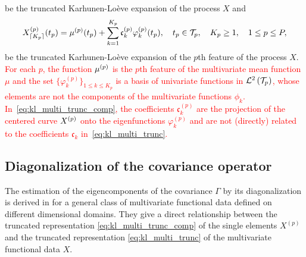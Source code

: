 be the truncated Karhunen-Loève expansion of the process $X$ and
\begin{equation}\label{eq:kl_multi_trunc_comp}
    X_{\lceil K_p \rceil}^{(p)}(t_p) = \mu^{(p)}(t_p) + \sum_{k = 1}^{K_p} \mathfrak{c}^{(p)}_k \varphi_k^{(p)}(t_p), \quad t_p \in \mathcal{T}_{p}, \quad K_p \geq 1, \quad 1 \leq p \leq P,
\end{equation}
be the truncated Karhunen-Loève expansion of the $p$th feature of the process $X$. \textcolor{red}{For each $p$, the function $\mu^{(p)}$ is the $p$th feature of the multivariate mean function $\mu$ and the set $\{\varphi^{(p)}_k\}_{1 \leq k \leq K_p}$ is a basis of univariate functions in $\mathcal{L}^{2}\left(\mathcal{T}_{p}\right)$, whose elements are not the components of the multivariate functions $\phi_k$. In~\eqref{eq:kl_multi_trunc_comp}, the coefficients $\mathfrak{c}^{(p)}_k$ are the projection of the centered curve $X^{(p)}$ onto the eigenfunctions $\varphi_k^{(p)}$ and are not (directly) related to the coefficients $\mathfrak{c}_k$ in~\eqref{eq:kl_multi_trunc}.}


\subsection{Diagonalization of the covariance operator} %
\label{sub:by_diagonalization_of_the_covariance_operator}

The estimation of the eigencomponents of the covariance $\Gamma$ by its diagonalization is derived in \cite{happMultivariateFunctionalPrincipal2018a} for a general class of multivariate functional data defined on different dimensional domains. They give a direct relationship between the truncated representation \eqref{eq:kl_multi_trunc_comp} of the single elements $X^{(p)}$ and the truncated representation \eqref{eq:kl_multi_trunc} of the multivariate functional data $X$.

